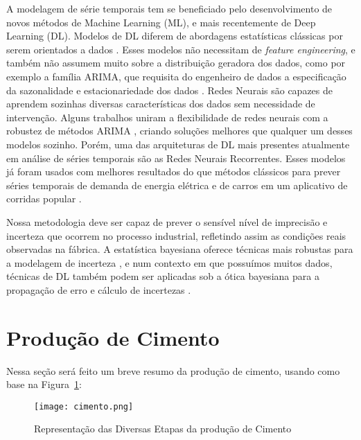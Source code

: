 A modelagem de série temporais tem se beneficiado pelo desenvolvimento de novos
métodos de Machine Learning (ML), e mais recentemente de Deep Learning (DL).
Modelos de DL diferem de abordagens estatísticas clássicas por serem orientados
a dados \citep{dlbook}.
Esses modelos não necessitam de \textit{feature engineering}, e também não
assumem muito sobre a distribuição geradora dos dados, como por exemplo a
família ARIMA, que requisita do engenheiro de dados a especificação da
sazonalidade e estacionariedade dos dados \citep{arima}.
Redes Neurais são capazes de aprendem sozinhas diversas características dos dados sem necessidade de intervenção. 
Alguns trabalhos uniram a flexibilidade de redes neurais com a robustez de
métodos ARIMA \citep{DIAZROBLES20088331,KHASHEI2010479},
criando soluções melhores que qualquer um desses modelos sozinho. Porém, uma das
arquiteturas de DL mais presentes atualmente em análise de séries temporais
são as Redes Neurais Recorrentes. Esses modelos já foram usados com
melhores resultados do que métodos clássicos para prever séries temporais de
demanda de energia elétrica e de carros em um aplicativo de corridas popular
\cite{energylstm,ubertime}.


Nossa metodologia deve ser capaz de prever o sensível nível de imprecisão e
incerteza que ocorrem no processo industrial,
refletindo assim as condições reais observadas na fábrica. A estatística bayesiana oferece técnicas
mais robustas para a modelagem de incerteza \cite{bayesml}, e num contexto em
que possuímos muitos dados, técnicas de DL também podem ser aplicadas sob a
ótica bayesiana para a propagação de erro e cálculo de incertezas \cite{ubertime,Gal2016Uncertainty}. 



\section{Produção de Cimento}
\label{sec:producao}

Nessa seção será feito um breve resumo da produção de cimento, usando como base na Figura~\ref{fig:cement}: \\ 

\begin{figure}[H]
\label{fig:cement}
\centering
\texttt{[image: cimento.png]}
\caption{Representação das Diversas Etapas da produção de Cimento \citep{cementroadmap}}
\end{figure}


